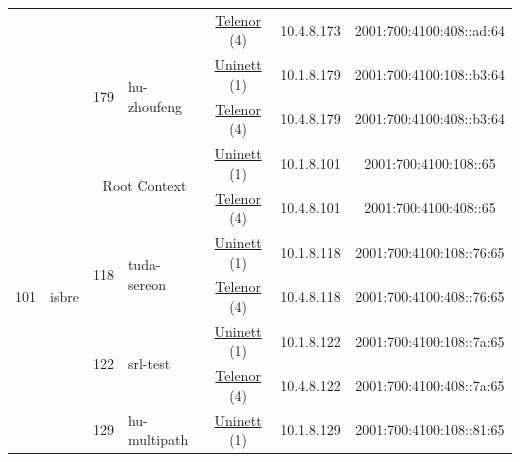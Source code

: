 \begin{small}
\begin{center}
\begin{longtable}{|c|c|c|c|c|c|c|c|}
  &  &  &  & \multicolumn{2}{|c|}{\tiny{\href{https://www.telenor.no}{Telenor} (4)}} & \tiny{10.4.8.173} & \tiny{2001:700:4100:408::ad:64} \\* \cline{3-3}\cline{4-4}\cline{5-5}\cline{6-6}\cline{7-7}\cline{8-8}
  &  & \multirow{2}{*}{\tiny{179}} & \multicolumn{1}{|l|}{\multirow{2}{*}{\tiny{hu-zhoufeng}}} & \multicolumn{2}{|c|}{\tiny{\href{https://www.uninett.no}{Uninett} (1)}} & \tiny{10.1.8.179} & \tiny{2001:700:4100:108::b3:64} \\* \cline{5-5}\cline{6-6}\cline{7-7}\cline{8-8}
  &  &  &  & \multicolumn{2}{|c|}{\tiny{\href{https://www.telenor.no}{Telenor} (4)}} & \tiny{10.4.8.179} & \tiny{2001:700:4100:408::b3:64} \\ \hline
 \multirow{32}{*}{\tiny{101}} & \multicolumn{1}{|l|}{\multirow{32}{*}{\tiny{isbre}}} & \multicolumn{2}{|c|}{\multirow{2}{*}{\tiny{Root Context}}} & \multicolumn{2}{|c|}{\tiny{\href{https://www.uninett.no}{Uninett} (1)}} & \tiny{10.1.8.101} & \tiny{2001:700:4100:108::65} \\* \cline{5-5}\cline{6-6}\cline{7-7}\cline{8-8}
  &  & \multicolumn{2}{|c|}{} & \multicolumn{2}{|c|}{\tiny{\href{https://www.telenor.no}{Telenor} (4)}} & \tiny{10.4.8.101} & \tiny{2001:700:4100:408::65} \\* \cline{3-3}\cline{4-4}\cline{5-5}\cline{6-6}\cline{7-7}\cline{8-8}
  &  & \multirow{2}{*}{\tiny{118}} & \multicolumn{1}{|l|}{\multirow{2}{*}{\tiny{tuda-sereon}}} & \multicolumn{2}{|c|}{\tiny{\href{https://www.uninett.no}{Uninett} (1)}} & \tiny{10.1.8.118} & \tiny{2001:700:4100:108::76:65} \\* \cline{5-5}\cline{6-6}\cline{7-7}\cline{8-8}
  &  &  &  & \multicolumn{2}{|c|}{\tiny{\href{https://www.telenor.no}{Telenor} (4)}} & \tiny{10.4.8.118} & \tiny{2001:700:4100:408::76:65} \\* \cline{3-3}\cline{4-4}\cline{5-5}\cline{6-6}\cline{7-7}\cline{8-8}
  &  & \multirow{2}{*}{\tiny{122}} & \multicolumn{1}{|l|}{\multirow{2}{*}{\tiny{srl-test}}} & \multicolumn{2}{|c|}{\tiny{\href{https://www.uninett.no}{Uninett} (1)}} & \tiny{10.1.8.122} & \tiny{2001:700:4100:108::7a:65} \\* \cline{5-5}\cline{6-6}\cline{7-7}\cline{8-8}
  &  &  &  & \multicolumn{2}{|c|}{\tiny{\href{https://www.telenor.no}{Telenor} (4)}} & \tiny{10.4.8.122} & \tiny{2001:700:4100:408::7a:65} \\* \cline{3-3}\cline{4-4}\cline{5-5}\cline{6-6}\cline{7-7}\cline{8-8}
  &  & \multirow{2}{*}{\tiny{129}} & \multicolumn{1}{|l|}{\multirow{2}{*}{\tiny{hu-multipath}}} & \multicolumn{2}{|c|}{\tiny{\href{https://www.uninett.no}{Uninett} (1)}} & \tiny{10.1.8.129} & \tiny{2001:700:4100:108::81:65} \\* \cline{5-5}\cline{6-6}\cline{7-7}\cline{8-8}

\end{longtable}
\end{center}
\end{small}
